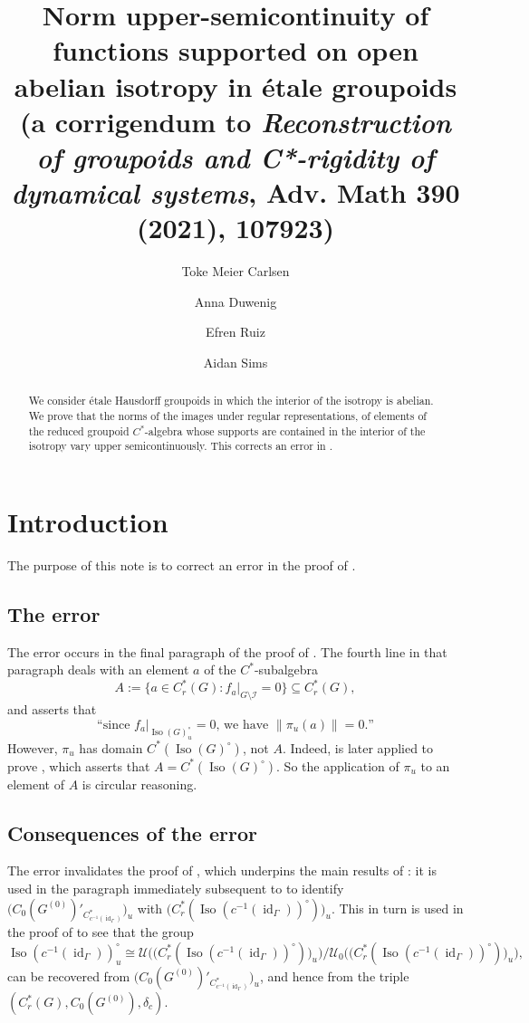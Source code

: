 \documentclass[a4paper, 12pt]{amsart}
\author[T.M.~Carlsen]{Toke Meier Carlsen}
\author{Anna Duwenig}
\author[E. Ruiz]{Efren Ruiz}
\author[A. Sims]{Aidan Sims}
\title[Norm upper-semicontinuity]{Norm upper-semicontinuity of functions supported on open abelian isotropy in \'etale groupoids
(a corrigendum to \emph{Reconstruction of groupoids and C*-rigidity of dynamical systems}, Adv. Math 390 (2021), 107923)}
\theoremstyle{plain}
\theoremstyle{definition}
\theoremstyle{remark}
\newcommand{\Iso}{\operatorname{Iso}}
\newcommand{\id}{\operatorname{id}}
\newcommand{\Ii}{\mathcal{I}}
\numberwithin{equation}{section}
\begin{document}
\begin{abstract}
We consider \'etale Hausdorff groupoids in which the interior of the isotropy is abelian. We prove that the norms of the images under regular representations, of elements of the reduced groupoid $C^*$-algebra whose supports are contained in the interior of the isotropy vary upper semicontinuously. This corrects an error in \cite{CRST}.
\end{abstract}

\maketitle

\section*{Introduction}
The purpose of this note is to correct an error in the proof of \cite[Lemma~5.2]{CRST}.

\subsection*{The error}
The error occurs in the final paragraph of the proof of \cite[Lemma~5.2]{CRST}. The fourth line in
that paragraph deals with an element $a$ of the $C^*$-subalgebra
\begin{equation}\label{eq:def A}
A := \{a \in C^*_r(G) : f_a|_{G \setminus \Ii} = 0\} \subseteq C^*_r(G),
\end{equation}
and asserts that
\begin{equation}\label{eq:just plain wrong}
\text{``since $f_a|_{\Iso(G)^\circ_u} = 0$, we have $\|\pi_u(a)\|= 0$.''}
\end{equation}
However, $\pi_u$ has domain $C^*(\Iso(G)^\circ)$, not $A$.
Indeed, \cite[Lemma~5.2]{CRST} is later applied to prove \cite[Corollary~5.3]{CRST}, which
asserts that $A = C^*(\Iso(G)^\circ)$. So the application of $\pi_u$ to an element of $A$
is circular reasoning.

\subsection*{Consequences of the error}
The error invalidates the proof of
\cite[Corollary~5.3]{CRST}, which underpins the main results of \cite{CRST}: it
is used in the paragraph immediately subsequent to \cite[Proposition~6.5]{CRST} to identify
$\big(C_0(G^{(0)})'_{C^*_{c^{-1}(\id_\Gamma)}}\big)_u$ with
$\big(C^*_r(\Iso(c^{-1}(\id_\Gamma))^\circ)\big)_u$. This in turn is used in
the proof of \cite[Proposition~6.5]{CRST} to see that the group
\[
\Iso(c^{-1}(\id_\Gamma))^\circ_u
    \cong \mathcal{U}\big(\big(C^*_r(\Iso(c^{-1}(\id_\Gamma))^\circ)\big)_u\big)
    / \mathcal{U}_0\big(\big(C^*_r(\Iso(c^{-1}(\id_\Gamma))^\circ)\big)_u\big),
\]
can be recovered from $\big(C_0(G^{(0)})'_{C^*_{c^{-1}(\id_\Gamma)}}\big)_u$,
and hence from the triple $(C^*_r(G), C_0(G^{(0)}), \delta_c)$.
\end{document}
